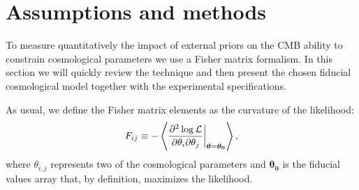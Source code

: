 \documentclass[aps,prd,reprint,superscriptaddress]{revtex4-1}
\newcommand\refeq[1]{Eq.~(\ref{eqn:#1})}
\begin{document}
\section{Assumptions and methods \label{sec:methods}}


To measure quantitatively the impact of external priors on the CMB ability to constrain cosmological parameters we use a Fisher matrix formalism. In this section we will quickly review the technique and then present the chosen fiducial cosmological model together with the experimental specifications.

As usual, we define the Fisher matrix elements as the curvature of the likelihood:
\begin{equation}
	\centering
		F_{ij} \equiv - \left\langle\frac{\partial^2 \log \mathcal{L}}{\partial \theta_i \partial \theta_j} \bigg|_{\boldsymbol{\theta} = \boldsymbol{\theta_0}}\right\rangle,
	\label{eqn:Fij_def}
\end{equation}
where $\theta_{i,j}$ represents two of the cosmological parameters and $\boldsymbol{\theta_0}$ is the fiducial values array that, by definition, maximizes the likelihood. 
\end{document}
